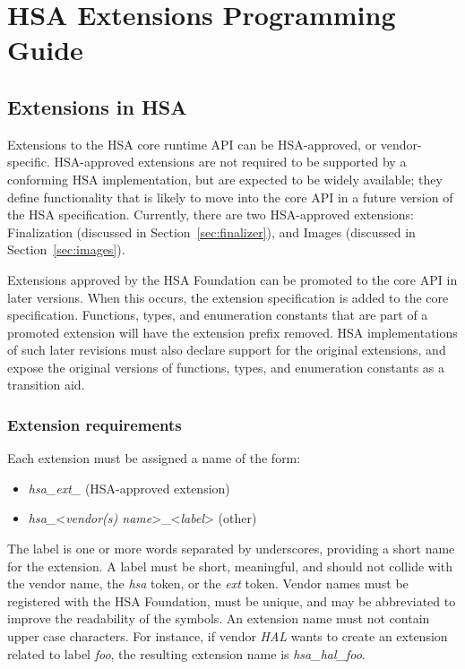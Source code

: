 \documentclass[final,oneside]{book}
\begin{document}
\chapter{HSA Extensions Programming Guide}

\section{Extensions in HSA}
Extensions to the HSA core runtime API can be HSA-approved, or vendor-specific.
HSA-approved extensions are not required to be supported by a conforming HSA
implementation, but are expected to be widely available; they define
functionality that is likely to move into the core API in a future version of
the HSA specification. Currently, there are two HSA-approved extensions:
Finalization (discussed in Section~\ref{sec:finalizer}), and Images
(discussed in Section~\ref{sec:images}).

Extensions approved by the HSA Foundation can be promoted to the core API in
later versions. When this occurs, the extension specification is added to the
core specification. Functions, types, and enumeration constants that are part of
a promoted extension will have the extension prefix removed. HSA implementations
of such later revisions must also declare support for the original extensions,
and expose the original versions of functions, types, and enumeration constants
as a transition aid.

\subsection{Extension requirements}

Each extension must be assigned a name of the form:
\begin{itemize}[itemsep=1pt,topsep=3pt,partopsep=0pt]
\item \textit{hsa_ext_} (HSA-approved extension)
\item \textit{hsa_}<\textit{vendor(s) name}>_<\textit{label}> (other)
\end{itemize}
The label is one or more words separated by underscores, providing a short name
for the extension. A label must be short, meaningful, and should not collide
with the vendor name, the \textit{hsa} token, or the \textit{ext} token. Vendor
names must be registered with the HSA Foundation, must be unique, and may be
abbreviated to improve the readability of the symbols. An extension name must
not contain upper case characters. For instance, if vendor \textit{HAL} wants to
create an extension related to label \textit{foo}, the resulting extension name
is \textit{hsa_hal_foo}.
\end{document}
